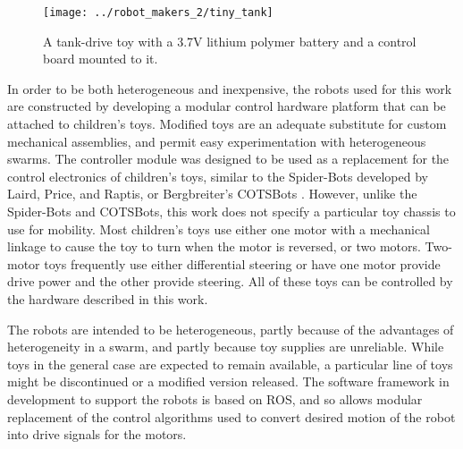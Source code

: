 \begin{figure}
	\centering
	\texttt{[image: ../robot\_makers\_2/tiny\_tank]}
	\caption{A tank-drive toy with a 3.7V lithium polymer battery and a control board mounted to it.}
\end{figure}

In order to be both heterogeneous and inexpensive, the robots used for this work are constructed by developing a modular control hardware platform that can be attached to children's toys. 
Modified toys are an adequate substitute for custom mechanical assemblies, and permit easy experimentation with heterogeneous swarms. 
The controller module was designed to be used as a replacement for the control electronics of children's toys, similar to the Spider-Bots developed by Laird, Price, and Raptis, or Bergbreiter's COTSBots \cite{lairdspider, bergbreiter2003cotsbots}.
However, unlike the Spider-Bots and COTSBots, this work does not specify a particular toy chassis to use for mobility. 
Most children's toys use either one motor with a mechanical linkage to cause the toy to turn when the motor is reversed, or two motors.
Two-motor toys frequently use either differential steering or have one motor provide drive power and the other provide steering. 
All of these toys can be controlled by the hardware described in this work. 

The robots are intended to be heterogeneous, partly because of the advantages of heterogeneity in a swarm, and partly because toy supplies are unreliable.
While toys in the general case are expected to remain available, a particular line of toys might be discontinued or a modified version released. 
The software framework in development to support the robots is based on ROS, and so allows modular replacement of the control algorithms used to convert desired motion of the robot into drive signals for the motors. 

